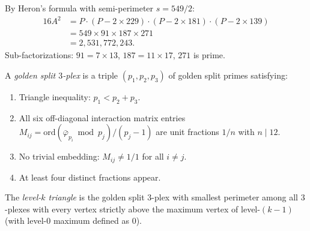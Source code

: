 \begin{result}
By Heron's formula with semi-perimeter $s = 549/2$:
\begin{align}
  16 A^2 &= P \cdot (P - 2 \times 229) \cdot (P - 2 \times 181)
    \cdot (P - 2 \times 139) \\
  &= 549 \times 91 \times 187 \times 271 \\
  &= 2{,}531{,}772{,}243.
\end{align}
Sub-factorizations: $91 = 7 \times 13$, $187 = 11 \times 17$,
$271$ is prime.
\end{result}

\begin{definition}
\label{def:3plex}
A \emph{golden split $3$-plex} is a triple $(p_1, p_2, p_3)$ of
golden split primes satisfying:
\begin{enumerate}
\item Triangle inequality: $p_1 < p_2 + p_3$.
\item All six off-diagonal interaction matrix entries $M_{ij} =
  \mathrm{ord}(\bar\varphi_{p_i} \bmod p_j) / (p_j - 1)$
  are unit fractions $1/n$ with $n \mid 12$.
\item No trivial embedding: $M_{ij} \neq 1/1$ for all $i \neq j$.
\item At least four distinct fractions appear.
\end{enumerate}
\end{definition}

\begin{definition}
\label{def:level}
The \emph{level-$k$ triangle} is the golden split $3$-plex with
smallest perimeter among all $3$-plexes with every vertex strictly
above the maximum vertex of level-$(k-1)$ (with level-$0$ maximum
defined as $0$).
\end{definition}

